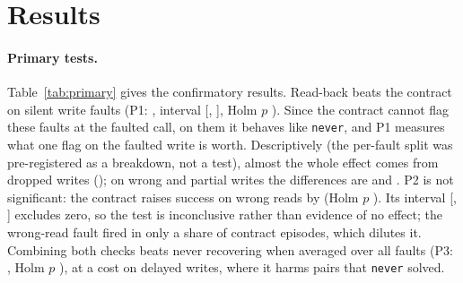 \section{Results}\label{sec:results}
\begin{table}[t]
\centering\small

\caption{Pre-registered primary tests on Qwen3-8B with recover. P1: \texttt{on\_readback} minus
\texttt{on\_contract} on the three silent write faults (\RPOneNPairs{} pairs); P2:
\texttt{on\_contract} minus \texttt{never} on wrong reads (\RPTwoNPairs{} pairs); P3:
\texttt{readback\_contract} minus \texttt{never} over all seven faults (\RPThreeNPairs{} pairs). Diff.\
is the mean of per-task differences in success; the confidence interval resamples tasks; $p$ is the
sign-flip permutation test and Holm $p$ corrects it across P1--P3. Rescue/harm count (task, fault,
seed) pairs where only the first or only the second arm succeeded.}\label{tab:primary}
\end{table}

\paragraph{Primary tests.} Table~\ref{tab:primary} gives the confirmatory results. Read-back beats
the contract on silent write faults (P1: \RPOneDiff{}, interval [\RPOneCiLo{}, \RPOneCiHi{}], Holm $p$
\RPOneHolmP{}). Since the contract cannot flag these faults at the faulted call, on them it behaves
like \texttt{never}, and P1 measures what one flag on the faulted write is worth. Descriptively (the per-fault split was
pre-registered as a breakdown, not a test), almost the whole
effect comes from dropped writes (\RPOneDropDiff{}); on wrong and partial writes the differences are
\RPOneWrongDiff{} and \RPOnePartialDiff{}. P2 is not significant: the contract raises success on wrong
reads by \RPTwoDiff{} (Holm $p$ \RPTwoHolmP{}). Its interval [\RPTwoCiLo{}, \RPTwoCiHi{}] excludes
zero, so the test is inconclusive rather than evidence of no effect; the wrong-read fault fired in only
a share \RExpQwenEightAppliedContractRead{} of contract episodes, which dilutes it. Combining both checks
beats never recovering when averaged over all faults (P3: \RPThreeDiff{}, Holm $p$ \RPThreeHolmP{}), at
a cost on delayed writes, where it harms \RPThreeDelayedHarmTotal{} pairs that \texttt{never} solved.


